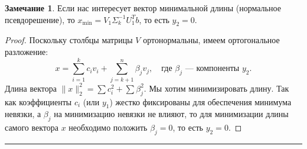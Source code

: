 \documentclass[12pt, a4paper]{article}
\theoremstyle{definition}
\newtheorem*{remark}{Замечание}
\begin{document}
\begin{remark}
Если нас интересует вектор минимальной длины (нормальное псевдорешение), то $x_{\min} = V_1 \Sigma_k^{-1} U_1^T b$, то есть $y_2 = 0$.
\end{remark}
\begin{proof}
Поскольку столбцы матрицы $V$ ортонормальны, имеем ортогональное разложение:
\[
x = \sum_{i=1}^k c_i v_i + \sum_{j=k+1}^n \beta_j v_j, \quad \text{где } \beta_j \text{ --- компоненты } y_2.
\]
Длина вектора $\|x\|_2^2 = \sum c_i^2 + \sum \beta_j^2$. Мы хотим минимизировать длину. Так как коэффициенты $c_i$ (или $y_1$) жестко фиксированы для обеспечения минимума невязки, а $\beta_j$ на минимизацию невязки не влияют, то для минимизации длины самого вектора $x$ необходимо положить $\beta_j = 0$, то есть $y_2 = 0$.
\end{proof}

\hrule\vspace{0.5cm}
\end{document}
